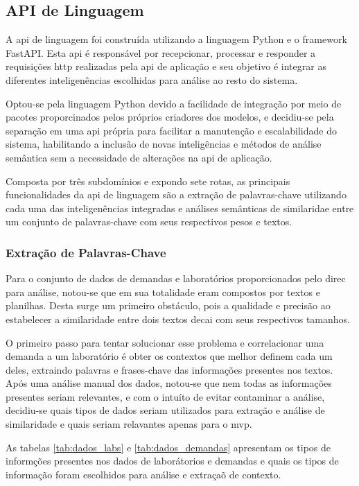 \subsection{API de Linguagem}\label{subsec:language_api}

A \gls{api} de linguagem foi construída utilizando a linguagem Python e o framework FastAPI. Esta \gls{api} é responsável por recepcionar, processar e responder a requisições \gls{http} realizadas pela \gls{api} de aplicação e seu objetivo é integrar as diferentes inteligenências escolhidas para análise ao resto do sistema.

Optou-se pela linguagem Python devido a facilidade de integração por meio de pacotes proporcinados pelos próprios criadores dos modelos, e decidiu-se pela separação em uma \gls{api} própria para facilitar a manutenção e escalabilidade do sistema, habilitando a inclusão de novas inteligências e métodos de análise semântica sem a necessidade de alterações na \gls{api} de aplicação.

Composta por três subdomínios e expondo sete rotas, as principais funcionalidades da \gls{api} de linguagem são a extração de palavras-chave utilizando cada uma das inteligenências integradas e análises semânticas de similaridae entre um conjunto de palavras-chave com seus respectivos pesos e textos.

\subsubsection{Extração de Palavras-Chave}\label{subsubsec:keyword_extraction}

Para o conjunto de dados de demandas e laboratórios proporcionados pelo \gls{direc} para análise, notou-se que em sua totalidade eram compostos por textos e planilhas. Desta surge um primeiro obstáculo, pois a qualidade e precisão ao estabelecer a similaridade entre dois textos decai com seus respectivos tamanhos.

O primeiro passo para tentar solucionar esse problema e correlacionar uma demanda a um laboratório é obter os contextos que melhor definem cada um deles, extraindo palavras e frases-chave das informações presentes nos textos. Após uma análise manual dos dados, notou-se que nem todas as informações presentes seriam relevantes, e com o intuíto de evitar contaminar a análise, decidiu-se quais tipos de dados seriam utilizados para extração e análise de similaridade e quais seriam relavantes apenas para o \gls{mvp}.

As tabelas \autoref{tab:dados_labs} e \autoref{tab:dados_demandas} apresentam os tipos de informções presentes nos dados de laborátorios e demandas e quais os tipos de informação foram escolhidos para análise e extraçaõ de contexto.

